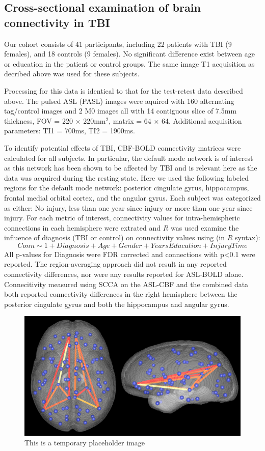 \documentclass{llncs}
\begin{document}
\subsection{Cross-sectional examination of brain connectivity in TBI}
 Our cohort consists of 41 participants, including 22 patients with TBI (9 females), and 18 controls (9 females). No significant difference exist between age or education in the patient or control groups.  The same image T1 acquisition as decribed above was used for these subjects.

 Processing for this data is identical to that for the test-retest data described above. The pulsed ASL (PASL) images were aquired with 160 alternating tag/control images and 2 M0 images all with 14 contiguous slice of 7.5mm thickness, FOV = 220 $\times$ 220mm$^2$, matrix = 64 $\times$ 64. Additional acquisition parameters: TI1 = 700ms, TI2 = 1900ms.

To identify potential effects of TBI, CBF-BOLD connectivity matrices were calculated for all subjects. In particular, the default mode network is of interest as this network has been shown to be affected by TBI \cite{} and is relevant here as the data was acquired during the resting state. Here we used the following labeled regions for the default mode network: posterior cingulate gyrus, hippocampus, frontal medial orbital cortex, and the angular gyrus. Each subject was categorized as either: No injury, less than one year since injury or more than one year since injury. For each metric of interest, connectivity values for intra-hemispheric connections in each hemisphere were extrated and $R$ was used examine the influence of diagnosis (TBI or control) on connectivity values using (in $R$ syntax):
\begin{equation}
Conn \sim 1 + Diagnosis + Age + Gender + YearsEducation + InjuryTime
\end{equation}
All p-values for Diagnosis were FDR corrected and connections with p<0.1 were reported. The region-averaging approach did not result in any reported connectivity differences, nor were any results reported for ASL-BOLD alone. Connecitivity measured using SCCA on the ASL-CBF and the combined data both reported connectivity differences in the right hemisphere between the posterior cingulate gyrus and both the hippocampus and angular gyrus.
 
\begin{figure}[tb]
\begin{center}
\includegraphics[width=0.5\linewidth]{dfm.png} 
\caption{This is a temporary placeholder image}
\label{fig:dfm}
\end{center}
\end{figure}
\end{document}
